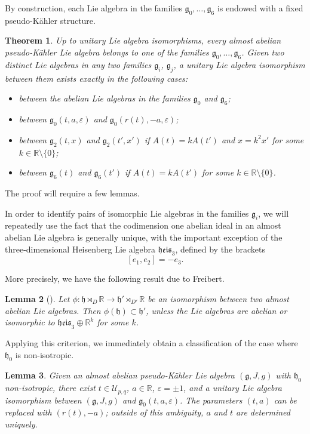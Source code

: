 \documentclass{article}
\newtheorem{theorem}{Theorem}[section]
\newtheorem{lemma}[theorem]{Lemma}
\theoremstyle{definition}
\newcommand{\R}{\mathbb{R}}
\newcommand{\frh}{\mathfrak{h}}
\newcommand{\lie}[1]{\mathfrak{#1}}
\newcommand{\g}{\lie g}
\newcommand{\h}{\lie h}
\begin{document}
By construction, each Lie algebra in the families $\g_0,\dotsc, \g_6$ is endowed with a fixed pseudo-Kähler structure.

\begin{theorem}\label{thm:classification}
    Up to unitary Lie algebra isomorphisms, every almost abelian pseudo-Kähler Lie algebra belongs to one of the families $\g_0,\dotsc, \g_6$. Given two distinct Lie algebras in any two families $\g_i$, $\g_j$, a unitary Lie algebra isomorphism between them exists exactly in the following cases: \begin{itemize}
        \item between the abelian Lie algebras in the families $\g_0$ and $\g_6$;
        \item between $\g_0(t,a,\varepsilon)$ and $\g_0(r(t),-a,\varepsilon)$;
        \item between $\g_2(t,x)$ and $\g_2(t',x')$ if $A(t)=kA(t')$ and $x=k^2x'$ for some $k\in\R\setminus\{0\}$;
        \item between $\g_6(t)$ and $\g_6(t')$ if $A(t)=kA(t')$ for some $k\in\R\setminus\{0\}$.
    \end{itemize}
\end{theorem}

The proof will require a few lemmas.\medskip

In order to identify pairs of isomorphic Lie algebras in the families $\g_i$, we will repeatedly use the fact that the codimension one abelian ideal in an almost abelian Lie algebra is generally unique, with the important exception of the three-dimensional Heisenberg Lie algebra $\mathfrak{heis}_3$, defined by the brackets $$[e_1,e_2]=-e_3.$$

More precisely, we have the following result due to Freibert.

\begin{lemma}[{\cite[Proposition 1]{Freibert12}}]\label{lemma:freibert}
    Let $\phi\colon\h\rtimes_D\R\to \h'\rtimes_{D'}\R$ be an isomorphism between two almost abelian Lie algebras. Then $\phi(\h)\subset\h'$, unless the Lie algebras are abelian or isomorphic to $\mathfrak{heis}_3\oplus\R^{k}$ for some $k$.
\end{lemma}

Applying this criterion, we immediately obtain a classification of the case  where $\frh_0$ is non-isotropic.

\begin{lemma}\label{lemma:classification_non-isotropic}
    Given an almost abelian pseudo-Kähler Lie algebra $(\g,J,g)$ with $\frh_0$ non-isotropic, there exist $t\in\mathcal{U}_{p,q}$, $a\in\R$, $\varepsilon=\pm1$, and a unitary Lie algebra isomorphism between $(\g,J,g)$ and $\g_0(t,a,\varepsilon)$. The parameters $(t,a)$ can be replaced with $(r(t),-a)$; outside of this ambiguity, $a$ and $t$ are determined uniquely.
\end{lemma}
\end{document}

